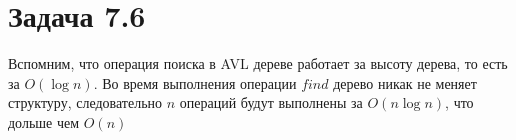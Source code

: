 \documentclass[12pt]{article}
\begin{document}
\section{Задача 7.6}
Вспомним, что операция поиска в AVL дереве работает за высоту дерева, то есть за
$O(\log n)$. Во время выполнения операции $find$ дерево никак не меняет
структуру, следовательно $n$ операций будут выполнены за $O(n \log n)$, что
дольше чем $O(n)$
\end{document}
